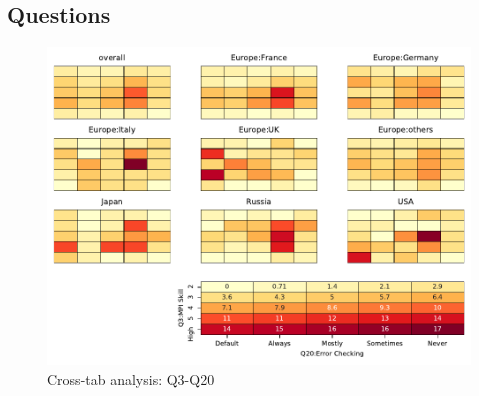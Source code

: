 
\subsection{Questions}


\begin{figure}
\begin{center}
\includegraphics[width=12cm]{../pdfs/Q3-Q20.pdf}
\caption{Cross-tab analysis: Q3-Q20}
\label{fig:Q3-Q20}
\end{center}
\end{figure}
